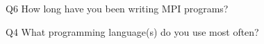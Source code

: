 \begin{description}%
\item{Q6} How long have you been writing MPI programs?%
\item{Q4} What programming language(s) do you use most often?%
\end{description}%
